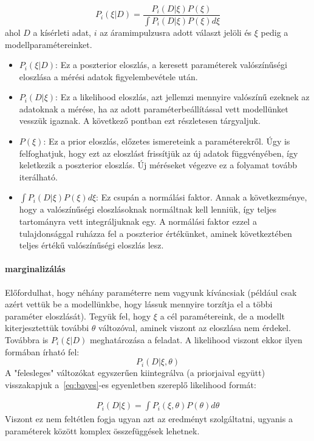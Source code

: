 \begin{equation}\label{eq:bayes}
P_i(\xi|D) = \dfrac{P_i(D|\xi)P(\xi)}{\int P_i(D|\xi)P(\xi)d\xi}
\end{equation}
ahol $D$ a kísérleti adat, $i$ az áramimpulzusra adott választ jelöli és $\xi$ pedig a modellparamétereinket.
\begin{itemize}
	\item $P_i(\xi|D)$: Ez a poszterior eloszlás, a keresett paraméterek valószínűségi eloszlása a mérési adatok figyelembevétele után.
	\item $P_i(D|\xi)$: Ez a likelihood eloszlás, azt jellemzi mennyire valószínű ezeknek az adatoknak a mérése, ha az adott paraméterbeállítással vett modellünket vesszük igaznak. A következő pontban ezt részletesen tárgyaljuk.
	\item $P(\xi)$: Ez a prior eloszlás, előzetes ismereteink a paraméterekről. Úgy is felfoghatjuk, hogy ezt az eloszlást frissítjük az új adatok függvényében, így keletkezik a poszterior eloszlás. Új méréseket végezve ez a folyamat tovább iterálható.
	\item $\int P_i(D|\xi)P(\xi)d\xi$: Ez csupán a normálási faktor. Annak a következménye, hogy a valószínűségi eloszlásoknak normáltnak kell lenniük, így teljes tartományra vett integráljuknak egy. A normálási faktor ezzel a tulajdonsággal ruházza fel a poszterior értékünket, aminek következtében teljes értékű valószínűségi eloszlás lesz.
\end{itemize}

\paragraph{marginalizálás}
Előfordulhat, hogy néhány paraméterre nem vagyunk kíváncsiak (például csak azért vettük be a modellünkbe, hogy lássuk mennyire torzítja el a többi paraméter eloszlását). Tegyük fel, hogy $\xi$ a cél paramétereink, de a modellt kiterjesztettük további $\theta$ változóval, aminek viszont az eloszlása nem érdekel. Továbbra is $P_i(\xi|D)$ meghatározása a feladat.  A likelihood viszont ekkor ilyen formában írható fel:
\[
P_i(D|\xi, \theta)
\]
A "felesleges" változókat egyszerűen kiintegrálva (a priorjaival együtt) visszakapjuk a~\ref{eq:bayes}-es egyenletben szereplő likelihood formát:

\begin{eqnarray}\label{eq:marginalize}
P_i(D|\xi) = \int P_i(\xi, \theta)P(\theta)d\theta
\end{eqnarray}
Viszont ez nem feltétlen fogja ugyan azt az eredményt szolgáltatni, ugyanis a paraméterek között komplex összefüggések lehetnek.

